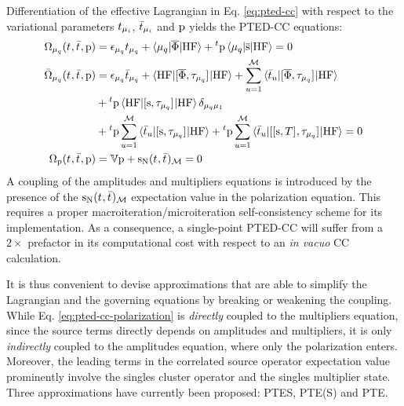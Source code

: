 Differentiation of the effective Lagrangian in Eq. \eqref{eq:pted-cc}
with respect to the variational parameters $t_{\mu_i}$,
$\bar{t}_{\mu_i}$ and $\mathrm{p}$ yields the \acrshort{PTED}-\acrshort{CC}
equations:
\begin{subequations}\label{eq:pted}
  \begin{align}
   \Omega_{\mu_q}(t_{}, \bar{t}_{}, \mathrm{p})  &=
   \epsilon_{\mu_q}t_{\mu_q} + \braket{\mu_q | \overline{\Phi} | \mathrm{HF}}
   + {}^t\mathrm{p}\braket{\mu_q | \overline{\mathrm{s}} | \mathrm{HF}}
             = 0 \label{eq:pted-cc-amplitudes}\\
   \bar{\Omega}_{\mu_q}(t_{}, \bar{t}_{}, \mathrm{p})
    &=
    \epsilon_{\mu_q}\bar{t}_{\mu_q} +
    \braket{\mathrm{HF} | [ \overline{\Phi}, \tau_{\mu_q} ]^{} | \mathrm{HF}} +
    \sum_{u=1}^{\mathcal{M}}\braket{\bar{t}_{u} |
    [ \overline{\Phi}, \tau_{\mu_q} ]^{} | \mathrm{HF}}
    \nonumber \\
    &+
    {}^t\mathrm{p}\braket{\mathrm{HF} | [ \mathrm{s}, \tau_{\mu_q} ]^{} | \mathrm{HF}}\delta_{\mu_q\mu_1} \nonumber \\
    &+
    {}^t\mathrm{p}\sum_{u=1}^{\mathcal{M}}\braket{\bar{t}_{u} | [ \mathrm{s}, \tau_{\mu_q} ]^{} | \mathrm{HF}}
    +
    {}^t\mathrm{p}\sum_{u=1}^{\mathcal{M}}\braket{\bar{t}_{u} | [ [ \mathrm{s}, T ]^{}, \tau_{\mu_q} ]^{} | \mathrm{HF}}
             = 0 \label{eq:pted-cc-multipliers}\\
    \Omega_{\mathrm{p}}(t_{}, \bar{t}_{}, \mathrm{p})
    &=
    \mathbb{V}\mathrm{p} + \mathrm{s}_{\mathrm{N}}(t_{}, \bar{t}_{})_\mathcal{M} = 0
    \label{eq:pted-cc-polarization}
  \end{align}
\end{subequations}
A coupling of the amplitudes and multipliers equations is introduced by
the presence of the $\mathrm{s}_{\mathrm{N}}(t_{}, \bar{t}_{})_\mathcal{M}$ expectation value
in the polarization equation.
This requires a proper macroiteration/microiteration self-consistency
scheme for its implementation.\autocite{Cammi2009-gu, Caricato2010-hx}
As a consequence, a single-point \acrshort{PTED}-\acrshort{CC} will suffer from a
$2\times$ prefactor in its computational cost with respect to an
\emph{in vacuo} \acrshort{CC} calculation.

It is thus convenient to devise approximations that are able to simplify the
Lagrangian and the governing equations by breaking or weakening the coupling.
While Eq. \eqref{eq:pted-cc-polarization} is \emph{directly} coupled to
the multipliers equation, since the source terms directly depends on
amplitudes and multipliers, it is only \emph{indirectly} coupled to the
amplitudes equation, where only the polarization enters.
Moreover, the leading terms in the correlated source operator
expectation value prominently involve the
singles cluster operator and the singles multiplier state.
Three approximations have currently been proposed: \gls{PTES}, \gls{PTE(S)}
and \gls{PTE}.

